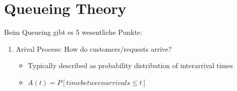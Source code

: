 \section{Queueing Theory}
Beim Queueing gibt es 5 wesentliche Punkte:
\begin{enumerate}
	\item Arival Process: How do customers/requests arrive?
		\begin{itemize}
			\item Typically described as probability distribution of interarrival times
			\item $A(t) = P[time between arrivals \le t]$
		\end{itemize}
\end{enumerate}
